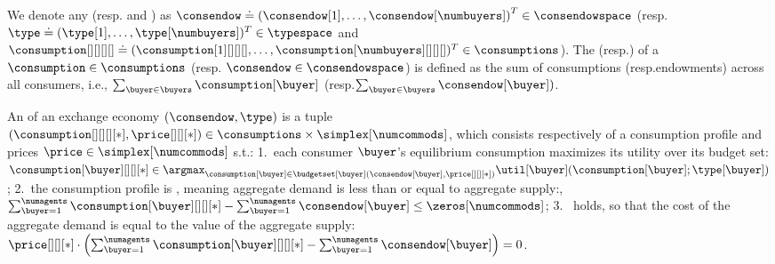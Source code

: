 We denote any  (resp.\@ {} and ) as $\consendow \doteq \left(\consendow[1], \hdots, \consendow[\numbuyers] \right)^T \in \consendowspace$ (resp.\@ $\type \doteq (\type[1], \hdots, \type[\numbuyers])^T \in \typespace$ and $\consumption[][][][] \doteq (\consumption[1][][][], \hdots, \consumption[\numbuyers][][][])^T \in \consumptions$).
The  (resp.\@ {}) of a  $\consumption \in \consumptions$ (resp.\@ {} $\consendow \in \consendowspace$) is defined as the sum of consumptions (resp.\@ endowments) across all consumers, i.e., $\sum_{\buyer \in \buyers} \consumption[\buyer]$ (resp.\@ $\sum_{\buyer \in \buyers} \consendow[\buyer])$.

\begin{definition}
    An  of an exchange economy $(\consendow, \type)$ is a tuple $(\consumption[][][][*], \price[][][*]) \in \consumptions \times \simplex[\numcommods]$, which consists respectively of a consumption profile and prices $\price \in \simplex[\numcommods]$ s.t.: 
    1.~each consumer $\buyer$'s equilibrium consumption maximizes its utility over its budget set:
        $\consumption[\buyer][][][*] \in \argmax_{\consumption[\buyer] \in \budgetset[\buyer] (\consendow[\buyer], \price[][][*])} \util[\buyer] (\consumption[\buyer]; \type[\buyer])$;
    2.~the consumption profile is , meaning aggregate demand is less than or equal to aggregate supply:,
        $\sum_{\buyer = 1}^{\numagents} \consumption[\buyer][][][*] - \sum_{\buyer = 1}^{\numagents} \consendow[\buyer] \leq \zeros[\numcommods]$;
    3.~ holds, so that the cost of the aggregate demand is equal to the value of the aggregate supply:
        $\price[][][*] \cdot \left( \sum_{\buyer = 1}^{\numagents} \consumption[\buyer][][][*]  - \sum_{\buyer = 1}^{\numagents} \consendow[\buyer] \right) = 0$. %
\end{definition}
\fi


